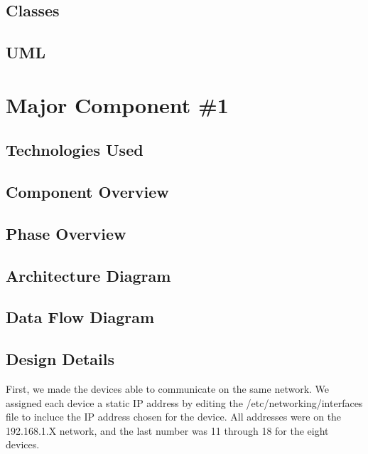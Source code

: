  \subsection{Classes}
 
 \subsection{UML}

\section{Major Component \#1 }

\subsection{Technologies  Used}
	 

\subsection{Component  Overview}

\subsection{Phase Overview}

\subsection{ Architecture  Diagram}


\subsection{Data Flow Diagram}


\subsection{Design Details}
First, we made the devices able to communicate on the same network. We assigned each device a static IP address by editing the /etc/networking/interfaces file to incluce the IP address chosen for the device. All addresses were on the 192.168.1.X network, and the last number was 11 through 18 for the eight devices.

